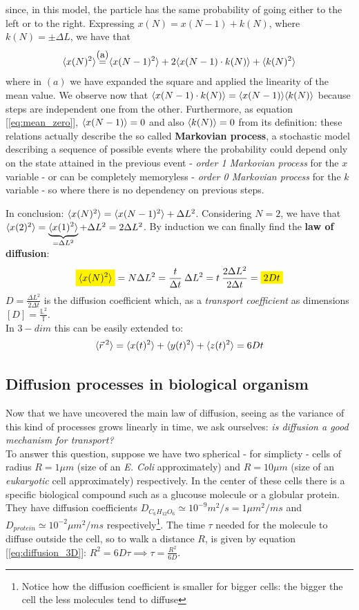 \documentclass[../main/main.tex]{subfiles}
\begin{document}
since, in this model, the particle has the same probability of going either to the left or to the right. 
Expressing $x(N)=x(N-1)+k(N)$, where $k(N)=\pm \Delta L$, we have that $$\vmedvec{x(N)^2}\myeq{a}\vmedvec{x(N-1)^2}+2\vmedvec{x(N-1)\cdot k(N)}+\vmedvec{k(N)^2}$$ where in $(a)$ we have expanded the square and applied the linearity of the mean value. We observe now that $\langle x(N-1)\cdot k(N) \rangle=\langle x(N-1) \rangle\langle k(N) \rangle$ because steps are independent one from the other. Furthermore, as equation [\ref{eq:mean_zero}], $\langle x(N-1) \rangle=0$ and also $\langle k(N) \rangle=0$ from its definition: these relations actually describe the so called \textbf{Markovian process}\cite{Markov}, a stochastic model describing a sequence of possible events where the probability could depend only on the state attained in the previous event - \emph{order 1 Markovian process} for the $x$ variable - or can be completely memoryless - \emph{order 0 Markovian process} for the $k$ variable - so where there is no dependency on previous steps.

In conclusion: $\langle x(N)^2 \rangle=\langle x(N-1)^2 \rangle+\Delta L^2$. Considering $N=2$, we have that $\langle x(2)^2 \rangle=\underbrace{\langle x(1)^2 \rangle}_{=\Delta L^2}+\Delta L^2=2\Delta L^2$. By induction we can finally find the \textbf{law of diffusion}:
\begin{equation}
    \mathcolorbox{yellow}{\vmedvec{x(N)^2}}=N\Delta L^2=\frac{t}{\Delta t}\:\Delta L^2=t\:\frac{2\Delta L^2}{2\Delta t}=\mathcolorbox{yellow}{2Dt}
    \label{eq:diffusion}
\end{equation} 
$D=\frac{\Delta L^2}{2\Delta t}$ is the diffusion coefficient which, as a \emph{transport coefficient} as dimensions $[D]=\frac{\mathbb{L}^2}{\mathbb{T}}$.\\
In $3-dim$ this can be easily extended to: 
\begin{equation}
    \langle \vec{r}^{\:2} \rangle=\langle x(t)^2 \rangle+\langle y(t)^2 \rangle+\langle z(t)^2 \rangle=6Dt
    \label{eq:diffusion_3D}
\end{equation}
    \subsection{Diffusion processes in biological organism}
Now that we have uncovered the main law of diffusion, seeing as the variance of this kind of processes grows linearly in time, we ask ourselves: \emph{is diffusion a good mechanism for transport?}\\
To answer this question, suppose we have two spherical - for simplicty - cells of radius $R=1\mu m$ (size of an \emph{E. Coli} approximately) and $R=10\mu m$ (size of an \emph{eukaryotic} cell approximately) respectively. In the center of these cells there is a specific biological compound such as a glucouse molecule or a globular protein. They have diffusion coefficients $D_{C_6H_{12}O_6}\simeq10^{-9}m^2/s=1\mu m^2/ms$ and $D_{protein}\simeq10^{-2}\mu m^2/ms$ respectively\footnote{Notice how the diffusion coefficient is smaller for bigger cells: the bigger the cell the less molecules tend to diffuse}. The time $\tau$ needed for the molecule to diffuse outside the cell, so to walk a distance $R$, is given by equation [\ref{eq:diffusion_3D}]: $R^2=6D\tau\implies \tau=\frac{R^2}{6D}$.
\end{document}
